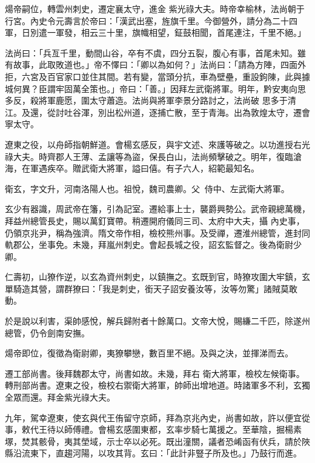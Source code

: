 \begin{pinyinscope}
 煬帝嗣位，轉雲州刺史，遷定襄太守，進金
 紫光祿大夫。時帝幸榆林，法尚朝于行宮。內史令元壽言於帝曰：「漢武出塞，旌旗千里。今御營外，請分為二十四軍，日別遣一軍發，相云三十里，旗幟相望，鉦鼓相聞，首尾連注，千里不絕。」



 法尚曰：「兵亙千里，動間山谷，卒有不虞，四分五裂，腹心有事，首尾未知。雖有故事，此取敗道也。」帝不懌曰：「卿以為如何？」法尚曰：「請為方陣，四面外拒，六宮及百官家口並住其間。若有變，當頭分抗，車為壁壘，重設鉤陳，此與據城何異？臣謂牢固萬全策也。」帝曰：「善。」因拜左武衛將軍。明年，黔安夷向思多反，殺將軍鹿愿，圍太守蕭造。法尚與將軍李景分路討之，法尚破
 思多于清江。及還，從討吐谷渾，別出松州道，逐捕亡散，至于青海。出為敦煌太守，遷會寧太守。



 遼東之役，以舟師指朝鮮道。會楊玄感反，與宇文述、來護等破之。以功進授右光祿大夫。時齊郡人王薄、孟讓等為盜，保長白山，法尚頻擊破之。明年，復臨滄海，在軍遇疾卒。贈武衛大將軍，謚曰僖。有子六人，紹範最知名。



 衛玄，字文升，河南洛陽人也。祖悅，魏司農卿。父，侍中、左武衛大將軍。



 玄少有器識，周武帝在籓，引為記室。遷給事上士，襲爵興勢公。武帝親總萬機，拜益州總管長史，賜以萬釘寶帶。稍遷開府儀同三司、太府中大夫，攝
 內史事，仍領京兆尹，稱為強濟。隋文帝作相，檢校熊州事。及受禪，遷淮州總管，進封同軌郡公，坐事免。未幾，拜嵐州刺史。會起長城之役，詔玄監督之。後為衛尉少卿。



 仁壽初，山獠作逆，以玄為資州刺史，以鎮撫之。玄既到官，時獠攻圍大牢鎮，玄單騎造其營，謂群獠曰：「我是刺史，銜天子詔安養汝等，汝等勿驚」諸賊莫敢動。



 於是說以利害，渠帥感悅，解兵歸附者十餘萬口。文帝大悅，賜縑二千匹，除遂州總管，仍令劍南安撫。



 煬帝即位，復徵為衛尉卿，夷獠攀戀，數百里不絕。及與之決，並揮涕而去。



 遷工部尚書。後拜魏郡太守，尚書如故。未幾，拜右
 衛大將軍，檢校左候衛事。轉刑部尚書。遼東之役，檢校右禦衛大將軍，帥師出增地道。時諸軍多不利，玄獨全眾而還。拜金紫光祿大夫。



 九年，駕幸遼東，使玄與代王侑留守京師，拜為京兆內史，尚書如故，許以便宜從事，敕代王待以師傅禮。會楊玄感圍東都，玄率步騎七萬援之。至華陰，掘楊素塚，焚其骸骨，夷其塋域，示士卒以必死。既出潼關，議者恐崤函有伏兵，請於陜縣沿流東下，直趨河陽，以攻其背。玄曰：「此計非豎子所及也。」乃鼓行而進。




\end{pinyinscope}
